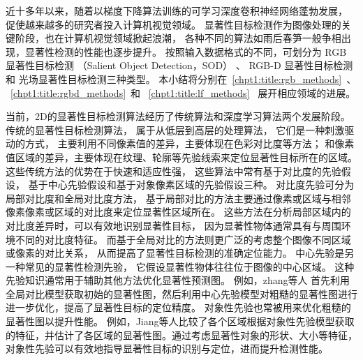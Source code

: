 近十多年以来，随着以梯度下降算法训练的可学习深度卷积神经网络蓬勃发展，
促使越来越多的研究者投入计算机视觉领域。
显著性目标检测作为图像处理的关键阶段，也在计算机视觉领域掀起浪潮，
各种不同的算法如雨后春笋一般争相出现，显著性检测的性能也逐步提升。
按照输入数据格式的不同，可划分为
RGB 显著性目标检测
（Salient Object Detection，SOD）
、
RGB-D 显著性目标检测和
光场显著性目标检测三种类型。
本小结将分别在~\ref{chpt1:title:rgb_methods}~、
~\ref{chpt1:title:rgbd_methods}~和
~\ref{chpt1:title:lf_methods}~
展开相应领域的进展。



\label{chpt1:title:rgb_methods}


当前，2D的显著性目标检测算法经历了传统算法和深度学习算法两个发展阶段。
传统的显著性目标检测算法，
属于从低层到高层的处理算法，
它们是一种刺激驱动的方式，
主要利用不同像素值的差异，主要体现在色彩对比度等方法；
和像素值区域的差异，主要体现在纹理、轮廓等先验线索来定位显著性目标所在的区域。
这些传统方法的优势在于快速和适应性强，
这些算法中常有基于对比度的先验假设，
基于中心先验假设和基于对象像素区域的先验假设三种。
对比度先验可分为局部对比度和全局对比度方法，
基于局部对比的方法主要通过像素或区域与相邻像素像素或区域的对比度来定位显著性区域所在。
这些方法在分析局部区域内的对比度差异时，可以有效地识别显著性目标，
因为显著性物体通常具有与周围环境不同的对比度特征。
而基于全局对比的方法则更广泛的考虑整个图像不同区域或像素的对比关系，
从而提高了显著性目标检测的准确定位能力。
中心先验是另一种常见的显著性检测先验，
它假设显著性物体往往位于图像的中心区域。
这种先验知识通常用于辅助其他方法优化显著性预测图。
例如，zhang等人
首先利用全局对比模型获取初始的显著性图，然后利用中心先验模型对粗糙的显著性图进行进一步优化，提高了显著性目标的定位精度。
对象性先验也常被用来优化粗糙的显著性图以提升性能。
例如，Jiang等人比较了各个区域根据对象性先验模型获取的特征，并估计了各区域的显著性图。通过考虑显著性对象的形状、大小等特征，对象性先验可以有效地指导显著性目标的识别与定位，进而提升检测性能。







